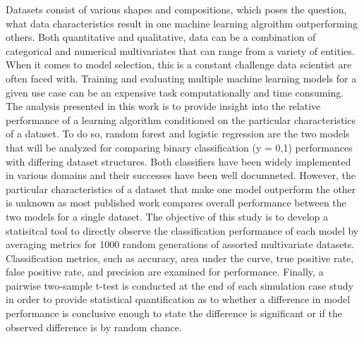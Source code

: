 \documentclass{llncs}
\begin{document}
Datasets consist of various shapes and compositions, which poses the question, what data characteristics result in one machine learning algroithm outperforming others. Both quantitative and qualitative, data can be a combination of categorical and numerical multivariates that can range from a variety of entities. When it comes to model selection, this is a constant challenge data scientist are often faced with. Training and evaluating multiple machine learning models for a given use case can be an expensive task computationally and time consuming. The analysis presented in this work is to provide insight into the relative performance of a learning algorithm conditioned on the particular characteristics of a dataset. To do so, random forest and logistic regression are the two models that will be analyzed for comparing binary classification (y = {0,1}) performances with differing dataset structures. Both classifiers have been widely implemented in various domains and their successes have been well documneted. However, the particular characteristics of a dataset that make one model outperform the other is unknown as most published work compares overall performance between the two models for a single dataset. The objective of this study is to develop a statisitcal tool to directly observe the classification performance of each model by averaging metrics for 1000 random generations of assorted multivariate datasets. Classification metrics, such as accuracy, area under the curve, true positive rate, false positive rate, and precision are examined for performance. Finally, a pairwise two-sample t-test is conducted at the end of each simulation case study in order to provide statistical quantification as to whether a difference in model performance is conclusive enough to state the difference is significant or if the observed difference is by random chance. 
\end{document}
